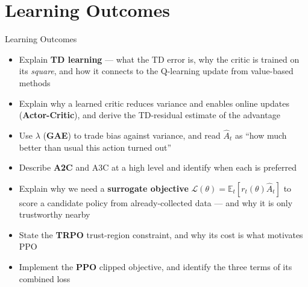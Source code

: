 \section{Learning Outcomes}
\begin{frame}{Learning Outcomes}
    \begin{itemize}
        \setlength{\itemsep}{0.55em}
        \item Explain \textbf{TD learning} --- what the TD error is, why the critic is trained on its \emph{square}, and how it connects to the Q-learning update from value-based methods
        \item Explain why a learned critic reduces variance and enables online updates (\textbf{Actor-Critic}), and derive the TD-residual estimate of the advantage
        \item Use $\lambda$ (\textbf{GAE}) to trade bias against variance, and read $\hat{A}_t$ as ``how much better than usual this action turned out''
        \item Describe \textbf{A2C} and A3C at a high level and identify when each is preferred
        \item Explain why we need a \textbf{surrogate objective} $\mathcal{L}(\theta) = \mathbb{E}_t[r_t(\theta)\hat{A}_t]$ to score a candidate policy from already-collected data --- and why it is only trustworthy nearby
        \item State the \textbf{TRPO} trust-region constraint, and why its cost is what motivates PPO
        \item Implement the \textbf{PPO} clipped objective, and identify the three terms of its combined loss
    \end{itemize}
\end{frame}
